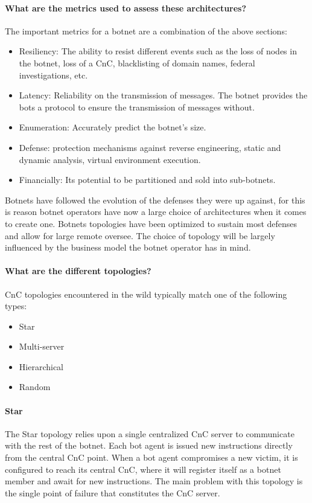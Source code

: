 \paragraph{What are the metrics used to assess these architectures?}
The important metrics for a botnet are a combination of the above sections:
\begin{itemize}[noitemsep]
\item Resiliency: The ability to resist different events such as the loss of nodes in the botnet, loss of a CnC, blacklisting of domain names, federal investigations, etc.
\item Latency: Reliability on the transmission of messages. The botnet provides the bots a protocol to ensure the transmission of messages without.
\item Enumeration: Accurately predict the botnet's size.
\item Defense: protection mechanisms against reverse engineering, static and dynamic analysis, virtual environment execution.
\item Financially: Its potential to be partitioned and sold into sub-botnets. 
\end{itemize}

Botnets have followed the evolution of the defenses they were up against, for this is reason botnet operators have now a large choice of architectures when it comes to create one. Botnets topologies have been optimized to sustain most defenses and allow for large remote oversee. The choice of topology will be largely influenced by the business model the botnet operator has in mind.

\paragraph{What are the different topologies?}
CnC topologies encountered in the wild typically match one of the following types:
\begin{itemize}[noitemsep]
\item Star
\item Multi-server
\item Hierarchical
\item Random
\end{itemize}
\cite{bot-prop}
\cite{army-bot}
\cite{p2p-bot}
\cite{mobius}
\cite{hybrid}

\paragraph{Star}
\cite{bot-com}
The Star topology relies upon a single centralized CnC server to communicate with the rest of the botnet. Each bot agent is issued new instructions directly from the central CnC point. When a bot agent compromises a new victim, it is configured to reach its central CnC, where it will register itself as a botnet member and await for new instructions. The main problem with this topology is the single point of failure that constitutes the CnC server.
\cite{bot-intro}

